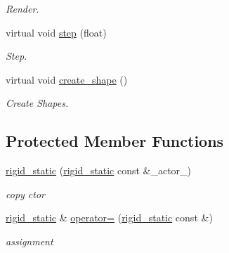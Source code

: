 \begin{DoxyCompactItemize}
\begin{DoxyCompactList}\small\item\em Render. \item\end{DoxyCompactList}\item 
virtual void \hyperlink{classnebula_1_1content_1_1actor_1_1physics_1_1rigid__static_a83be7bda449d94b5d7a69c8b8f99f6de}{step} (float)
\begin{DoxyCompactList}\small\item\em Step. \item\end{DoxyCompactList}\item 
virtual void \hyperlink{classnebula_1_1content_1_1actor_1_1physics_1_1rigid__static_a0f4319c5cceb75e7d4376b82dba662de}{create\_\-shape} ()
\begin{DoxyCompactList}\small\item\em Create Shapes. \item\end{DoxyCompactList}\end{DoxyCompactItemize}
\subsection*{Protected Member Functions}
\begin{DoxyCompactItemize}
\item 
\hyperlink{classnebula_1_1content_1_1actor_1_1physics_1_1rigid__static_aa97ef700bd409b75f315e227edf2c154}{rigid\_\-static} (\hyperlink{classnebula_1_1content_1_1actor_1_1physics_1_1rigid__static}{rigid\_\-static} const \&\_\-actor\_\-)
\begin{DoxyCompactList}\small\item\em copy ctor \item\end{DoxyCompactList}\item 
\hyperlink{classnebula_1_1content_1_1actor_1_1physics_1_1rigid__static}{rigid\_\-static} \& \hyperlink{classnebula_1_1content_1_1actor_1_1physics_1_1rigid__static_ae32ba52ca54bc1cc78572b931a98600d}{operator=} (\hyperlink{classnebula_1_1content_1_1actor_1_1physics_1_1rigid__static}{rigid\_\-static} const \&)
\begin{DoxyCompactList}\small\item\em assignment \item\end{DoxyCompactList}\end{DoxyCompactItemize}


